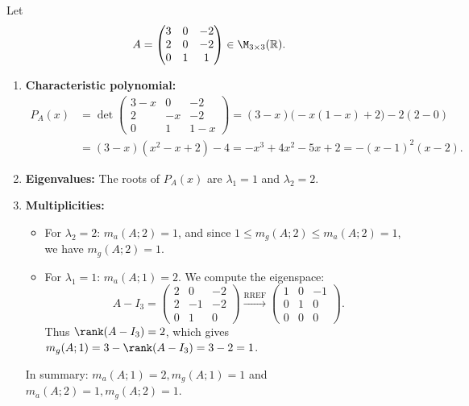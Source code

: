 \begin{exercisesolution*}
\label{sol:multiplicities_3x3_matrix}
Let
\[
A = \begin{pmatrix} 3 & 0 & -2 \\ 2 & 0 & -2 \\ 0 & 1 & 1 \end{pmatrix} \in \M_{3 \times 3}(\mathbb{R}).
\]
\begin{enumerate}[label=\textbf{(\alph*)}]
    \item \textbf{Characteristic polynomial:}
    \begin{align*}
    P_A(x) &= \det \begin{pmatrix} 3-x & 0 & -2 \\ 2 & -x & -2 \\ 0 & 1 & 1-x \end{pmatrix} = (3-x)\big(-x(1-x) + 2\big) - 2(2 - 0) \\
    &= (3-x)(x^2 - x + 2) - 4 = -x^3 + 4x^2 - 5x + 2 = -(x-1)^2(x-2).
    \end{align*}

    \item \textbf{Eigenvalues:}
    The roots of $P_A(x)$ are $\lambda_1 = 1$ and $\lambda_2 = 2$.

    \item \textbf{Multiplicities:}
    \begin{itemize}
        \item For $\lambda_2 = 2$: $m_a(A; 2) = 1$, and since $1 \le m_g(A; 2) \le m_a(A; 2) = 1$, we have $m_g(A; 2) = 1$.
        \item For $\lambda_1 = 1$: $m_a(A; 1) = 2$. We compute the eigenspace:
        \[
        A - I_3 = \begin{pmatrix} 2 & 0 & -2 \\ 2 & -1 & -2 \\ 0 & 1 & 0 \end{pmatrix} \xrightarrow{\text{RREF}} \begin{pmatrix} 1 & 0 & -1 \\ 0 & 1 & 0 \\ 0 & 0 & 0 \end{pmatrix}.
        \]
        Thus $\rank(A - I_3) = 2$, which gives $m_g(A; 1) = 3 - \rank(A - I_3) = 3 - 2 = 1$.
    \end{itemize}
    In summary: $m_a(A; 1) = 2, m_g(A; 1) = 1$ and $m_a(A; 2) = 1, m_g(A; 2) = 1$. \qedhere
\end{enumerate}
\end{exercisesolution*}

